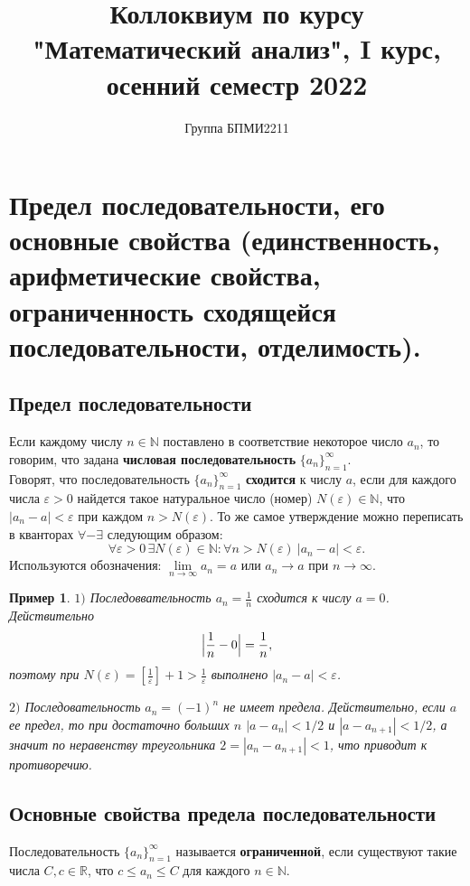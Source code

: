 \documentclass[12pt]{article}
\title{Коллоквиум по курсу "Математический анализ", I курс, осенний семестр 2022}
\author{Группа БПМИ2211}
\newtheorem{example}[theorem]{Пример}
\theoremstyle{definition}
\begin{document}
\maketitle

\section{Предел последовательности, его основные свойства (единственность, арифметические свойства, ограниченность сходящейся последовательности, отделимость).}
\subsection{Предел последовательности}
Если каждому числу $n\in \mathbb{N}$ поставлено в соответствие некоторое число $a_n$, то говорим, что задана {\bf числовая последовательность} $\{a_n\}_{n=1}^\infty$. \\
Говорят, что последовательность $\{a_n\}_{n=1}^\infty$
{\bf сходится} к числу $a$,
если
для каждого числа $\varepsilon>0$
найдется такое натуральное число (номер) $N(\varepsilon)\in \mathbb{N}$,
что $|a_n - a|<\varepsilon$ при каждом $n>N(\varepsilon)$.
То же самое утверждение можно переписать в кванторах $\forall-\exists$
следующим образом:
$$
\forall\varepsilon>0\, \exists N(\varepsilon)\in \mathbb{N}\colon \forall n>N(\varepsilon)\ |a_n-a|<\varepsilon.
$$
Используются обозначения: $\lim\limits_{n\to\infty}a_n=a$ или $a_n\to a$ при $n\to \infty$.

\begin{example}
$1)$ Последоввательность $a_n=\frac{1}{n}$ сходится к числу $a=0$.
Действительно
$$
\Bigl|\frac{1}{n} - 0\Bigr|= \frac{1}{n},
$$
поэтому при $N(\varepsilon)=[\frac{1}{\varepsilon}]+1>\frac{1}{\varepsilon}$ выполнено
$|a_n-a|<\varepsilon$.


$2)$ Последовательность $a_n = (-1)^n$ не имеет предела.
Действительно, если $a$ ее предел, то при достаточно больших $n$
$|a-a_n|<1/2$ и $|a-a_{n+1}|<1/2$, а значит по неравенству треугольника
$2=|a_n - a_{n+1}|<1$, что приводит к противоречию.
\end{example}
\subsection{Основные свойства предела последовательности}
Последовательность $\{a_n\}_{n=1}^\infty$
называется {\bf ограниченной}, если существуют такие числа
$C,c\in \mathbb{R}$, что $c\le a_n\le C$ для каждого $n\in \mathbb{N}$.
\end{document}
